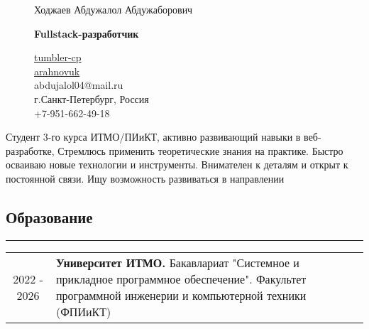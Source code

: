 \documentclass[a4paper,10pt]{article}
\begin{document}
\begin{figure}[!htb]
    \begin{minipage}{.5\textwidth}
        \begin{flushleft}
            \begin{Large}
            Ходжаев Абдужалол Абдужаборович\\
            \end{Large}
            \begin{large}
                \textbf{Fullstack-разработчик}
            \end{large}
        \end{flushleft}
    \end{minipage}
    \begin{minipage}{.5\textwidth}
        \begin{flushright}
            \begin{small}
                \href{https://github.com/tumbler-cp}{tumbler-cp} \faGithub\\
                \href{https://t.me/arahnovuk}{arahnovuk} \faTelegram\\
                abdujalol04@mail.ru \faAt\\
                г.Санкт-Петербург, Россия \faMapMarker\\
                +7-951-662-49-18 \faPhone
            \end{small}
        \end{flushright}
    \end{minipage}
\end{figure}
\noindent 
Студент 3-го курса 
ИТМО/ПИиКТ,
активно развивающий навыки в веб-разработке,
Стремлюсь применить теоретические знания на практике.
Быстро осваиваю новые технологии и инструменты.
Внимателен к деталям и открыт к постоянной связи. Ищу возможность развиваться в направлении\\
\subsection*{Образование}
\hrule
\vspace*{5mm}
\begin{tabular}{c | p{}}
    2022 - 2026 & \textbf{Университет ИТМО.} Бакавлариат "Системное и прикладное программное обеспечение". Факультет программной инженерии и компьютерной техники (ФПИиКТ)  \\
\end{tabular}
\end{document}
